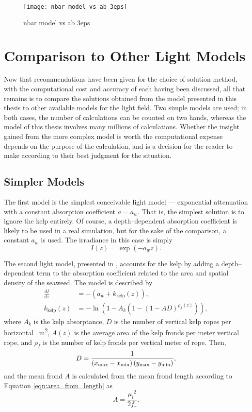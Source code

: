\begin{figure}[H]
  \centering
  \texttt{[image: nbar\_model\_vs\_ab\_3eps]}
  \caption{nbar model vs ab 3eps}
  \label{fig:nbar_model_vs_ab_3eps}
\end{figure}


\section{Comparison to Other Light Models}

Now that recommendations have been given for the choice of solution method, with the computational cost and accuracy of each having been discussed, all that remains is to compare the solutions obtained from the model presented in this thesis to other available models for the light field.
Two simple models are used; in both cases, the number of calculations can be counted on two hands, whereas the model of this thesis involves many millions of calculations.
Whether the insight gained from the more complex model is worth the computational expense depends on the purpose of the calculation, and is a decision for the reader to make according to their best judgment for the situation.

\subsection{Simpler Models}
The first model is the simplest conceivable light model --- exponential attenuation with a constant absorption coefficient $a=a_w$.
That is, the simplest solution is to ignore the kelp entirely.
Of course, a depth--dependent absorption coefficient is likely to be used in a real simulation, but for the sake of the comparison, a constant $a_w$ is used.
The irradiance in this case is simply
\begin{equation}
  I(z) = \exp\left(-a_w z \right).
\end{equation}

The second light model, presented in \citep{broch_modelling_2012}, accounts for the kelp by adding a depth--dependent term to the absorption coefficient related to the area and spatial density of the seaweed.
The model is described by
\begin{align}
  \frac{dI}{dz} &= -\left(a_w + k_{\mbox{kelp}}(z)\right),
  \label{eqn:exp_kelp_dIdz}\\
  k_{\mbox{kelp}}(z) &= -\ln(1-A_k(1-(1-AD)^{\rho_f(z)})),
  \label{eqn:exp_kelp_k}
\end{align}
where $A_k$ is the kelp absorptance, $D$ is the number of vertical kelp ropes per horizontal \SI{}{\m\squared}, $A(z)$ is the average area of the kelp fronds per meter vertical rope, and $\rho_f$ is the number of kelp fronds per vertical meter of rope.
Then,
\begin{equation}
  D = \frac{1}{\left({x_{\max}}-{x_{\min}}\right) \left({y_{\max}}-{y_{\min}}\right)},
\end{equation}
and the mean frond $A$ is calculated from the mean frond length according to Equation \eqref{eqn:area_from_length} as
\begin{equation}
  A = \frac{{\mu_l}^2}{2f_r}.
\end{equation}

